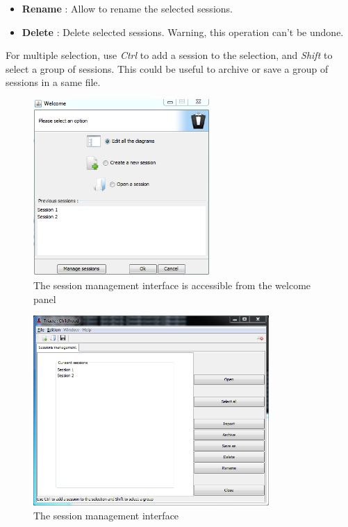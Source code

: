 \begin{itemize}
\item \textbf{Rename} : Allow to rename the selected sessions.\\
\item \textbf{Delete} : Delete selected sessions. Warning, this operation can't be undone.\\
\end{itemize}

For multiple selection, use \textit{Ctrl} to add a session to the selection, and \textit{Shift} to select a group of sessions. This could be useful to archive or save a group of sessions in a same file.\\

\begin{figure}[h!]
\centering
\includegraphics[width=0.6\textwidth]{images/ouverture_session.png}
\caption{The session management interface is accessible from the welcome panel}
\end{figure}

\begin{figure}[h!]
\centering
\includegraphics[width=0.8\textwidth]{images/gestion_session.png}
\caption{The session management interface}
\end{figure}
